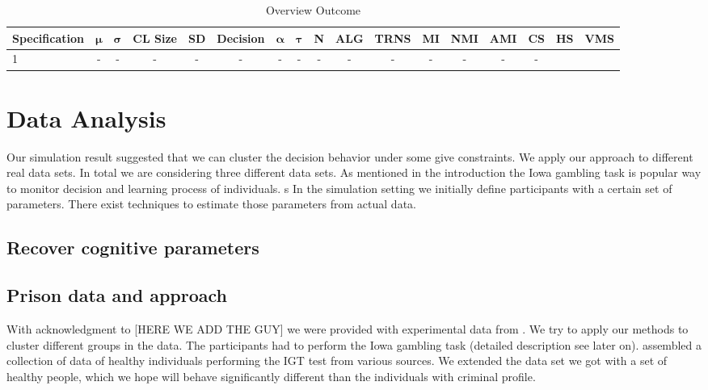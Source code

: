 \documentclass[12pt,a4paper,bibliography=totocnumbered,listof=totocnumbered]{scrartcl}
\begin{document}
\pagebreak

\begin{table}
	\centering
	\begin{tabular}{| l || c | c | c | c | c | c | c | c | c | c || c  |  c | c | c | c | c | }
		\toprule \toprule
		\textbf{Specification} &$\boldsymbol{\mu}$ & $\boldsymbol{\sigma}$ & \textbf{CL Size} & \textbf{SD} & \textbf{Decision} & $\boldsymbol{\alpha}$  &  $\boldsymbol{\tau}$  & \textbf{N} & \textbf{ALG} & \textbf{TRNS} &  \textbf{MI} & \textbf{NMI} &  \textbf{AMI} &  \textbf{CS} &  \textbf{HS } & \textbf{VMS}     \\
		\hline
		1 & -  & -& -& -& -& -& -& -& -& -& -& -& - & - \\
		\bottomrule
	\end{tabular}
	\caption{Overview Outcome }
\end{table}







\section{Data Analysis}

Our simulation result suggested that we can cluster the decision behavior under some give constraints. We apply our approach to different real data sets. In total we are considering three different data sets. As mentioned in the introduction the Iowa gambling task is popular way to monitor decision and learning process of individuals. s
In the simulation setting we initially define participants with a certain set of parameters. There exist techniques to estimate those parameters from actual data. 

\subsection{Recover cognitive parameters}


\subsection{Prison data and approach}

With acknowledgment to [HERE WE ADD THE GUY] we were provided with experimental data from \cite{Yechiam2008}. We try to apply our methods to cluster different groups in the data. The participants had to perform the Iowa gambling task (detailed description see later on). \cite{Steingroever2015} assembled a collection of data of healthy individuals performing the IGT test from various sources. We extended the data set we got with a set of healthy people, which we hope will behave significantly different than the individuals with criminal profile.
\end{document}
